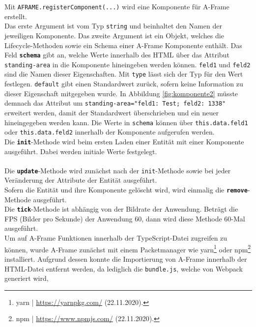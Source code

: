 \documentclass[a4paper,12pt,oneside]{article}
\begin{document}
        Mit \texttt{AFRAME.registerComponent(...)} wird eine
        Komponente für A-Frame erstellt. \\
        Das erste Argument ist vom Typ \texttt{string}
        und beinhaltet den Namen der jeweiligen Komponente. Das zweite Argument
        ist ein Objekt, welches die Lifecycle-Methoden sowie ein Schema 
        einer A-Frame Komponente enthält.
        Das Feld \texttt{\textbf{schema}} gibt an, welche Werte
        innerhalb des HTML über das Attribut \texttt{standing-area} 
        in die Komponente hineingeben werden können. \texttt{feld1}
        und \texttt{feld2} sind die Namen dieser Eigenschaften. Mit \texttt{type}
        lässt sich der Typ für den Wert festlegen. \texttt{default}
        gibt einen Standardwert zurück, sofern keine Information zu dieser
        Eigenschaft mitgegeben wurde. In Abbildung \ref{fig:komponente2} müsste
        demnach das Attribut um \texttt{standing-area="feld1: Test; feld2: 1338"}
        erweitert werden, damit der Standardwert überschrieben und ein
        neuer hineingegeben werden kann. Die Werte in \texttt{schema} können
        über \texttt{this.data.feld1} oder \texttt{this.data.feld2} 
        innerhalb der Komponente aufgerufen werden. \\
        Die \texttt{\textbf{init}}-Methode wird beim ersten Laden einer
        Entität mit einer Komponente ausgeführt. Dabei werden
        initiale Werte festgelegt. \\ \\
        Die \texttt{\textbf{update}}-Methode wird zunächst nach der
        \texttt{init}-Methode sowie bei jeder Veränderung der
        Attribute der Entität ausgeführt. \\
        Sofern die Entität und ihre Komponente gelöscht wird, wird einmalig
        die \texttt{\textbf{remove}}-Methode ausgeführt. \\
        Die \texttt{\textbf{tick}}-Methode ist abhängig von der Bildrate der
        Anwendung. Beträgt die FPS (Bilder pro
        Sekunde) der Anwendung 60, dann wird diese Methode 60-Mal ausgeführt. \\
        Um auf A-Frame Funktionen innerhalb der TypeScript-Datei zugreifen
        zu können, wurde A-Frame zunächst mit einem Packetmanager wie yarn\footnote{yarn | \url{https://yarnpkg.com/} (22.11.2020).}
        oder npm\footnote{npm | \url{https://www.npmjs.com/} (22.11.2020).} installiert. 
        Aufgrund dessen konnte die Importierung
        von A-Frame innerhalb der HTML-Datei entfernt werden, da
        lediglich die \texttt{bundle.js}, welche von Webpack generiert wird,
\end{document}
